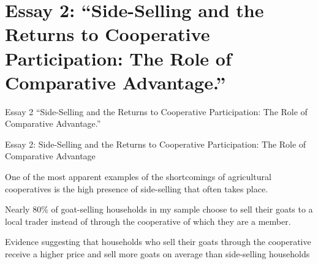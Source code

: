 \documentclass[aspectratio=169]{beamer}
\newenvironment{wideitemize}{\itemize\addtolength{\itemsep}{10pt}}{\enditemize}
\begin{document}
\section{Essay 2: ``Side-Selling and the Returns to Cooperative Participation: The Role of Comparative Advantage.''}
\begin{frame}{Essay 2}
\centering
\Large{``Side-Selling and the Returns to Cooperative Participation: The Role of Comparative Advantage.''}
\end{frame}


\begin{frame}{Essay 2: Side-Selling and the Returns to Cooperative Participation: The Role of Comparative Advantage}

    \begin{wideitemize}
        \item One of the most apparent examples of the shortcomings of agricultural cooperatives is the high presence of side-selling that often takes place. 
        \item Nearly 80\% of goat-selling households in my sample choose to sell their goats to a local trader instead of through the cooperative of which they are a member. \vspace{.25cm}
         \begin{wideitemize}
             \item Evidence suggesting that households who sell their goats through the cooperative receive a higher price and sell more goats on average than side-selling households
         \end{wideitemize}
    \end{wideitemize}
\end{frame}
\end{document}
